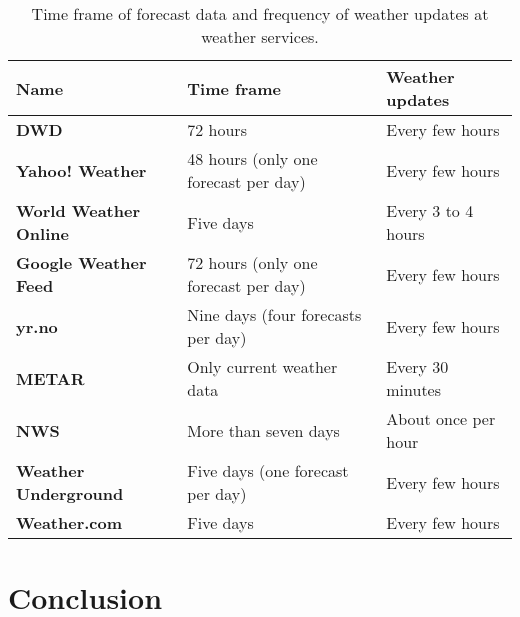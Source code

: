 \begin{table}
\centering
\begin{tabular}{|p{}|p{}|p{}|}
  \hline
  \textbf{Name} & \textbf{Time frame} & \textbf{Weather updates} \\
  \hline\hline
  \textbf{DWD} & 72 hours & Every few hours \\
  \hline
  \textbf{Yahoo! Weather} & 48 hours (only one forecast per day) & Every few hours \\
  \hline
  \textbf{World Weather Online} & Five days & Every \num{3} to \num{4} hours \\
  \hline
  \textbf{Google Weather Feed} & 72 hours (only one forecast per day) & Every few hours \\
  \hline
  \textbf{yr.no} & Nine days (four forecasts per day) & Every few hours \\
  \hline
  \textbf{\acs{METAR}} & Only current weather data & Every 30 minutes \\
  \hline
  \textbf{\acs{NWS}} & More than seven days & About once per hour \\
  \hline
  \textbf{Weather Underground} & Five days (one forecast per day) & Every few hours \\
  \hline
  \textbf{Weather.com} & Five days & Every few hours \\
  \hline
\end{tabular}
\caption{Time frame of forecast data and frequency of weather updates at weather services.}
\label{table:weather_data7}
\end{table}

\section{Conclusion}
\label{sec:weather_conclusion}

